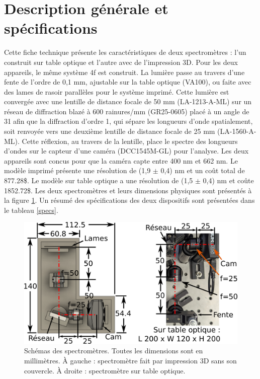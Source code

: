 \documentclass[11pt,letterpaper]{article}
\begin{document}
\section{Description générale et spécifications}

Cette fiche technique présente les caractéristiques de deux spectromètres : l'un construit sur 
table optique et l'autre avec de l'impression 3D. Pour les deux appareils, le même système 4f
est construit. La lumière passe au travers d'une fente de l'ordre de 0,1 mm, 
ajustable sur la table optique (VA100), ou faite avec des lames de rasoir parallèles pour le
système imprimé. Cette lumière est convergée avec une lentille de distance focale de 50 mm 
(LA-1213-A-ML) sur un réseau de diffraction blazé à 600 rainures/mm (GR25-0605) placé à un
angle de 31\degree $\;$afin que la diffraction d'ordre 1, qui sépare les
longueurs d'onde spatialement, soit renvoyée vers une deuxième lentille de distance focale
de 25 mm (LA-1560-A-ML). Cette réflexion, au travers de la lentille, place le spectre des 
longueurs d'ondes sur le capteur d'une caméra (DCC1545M-GL) pour l'analyse. Les deux appareils
sont concus pour que la caméra capte entre 400 nm et 662 nm. Le modèle imprimé présente une
résolution de (1,9 $\pm$ 0,4) nm et un coût total de 877.28\$. Le modèle sur
table optique a une résolution de (1,5 $\pm$ 0,4) nm et coûte 1852.72\$. Les
deux spectromètres et leurs dimensions physiques sont présentés à la figure 
\ref{schema_spectros}. Un résumé des spécifications des deux dispositifs sont présentées dans le tableau \ref{specs}. 


\begin{figure}[H]
  \centering
  \includegraphics[scale=1.75]{schema_spectros.png}
  \caption{Schémas des spectromètres. Toutes les dimensions sont en millimètres. À gauche : spectromètre fait par impression 3D sans son couvercle. À droite : spectromètre sur table optique.}
  \label{schema_spectros}
\end{figure}
\end{document}
